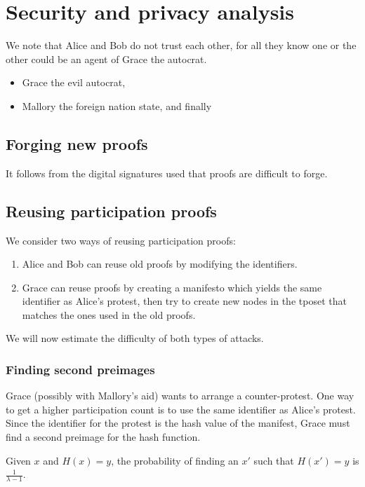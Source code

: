 \section{Security and privacy analysis}%
\label{SecurityAnalysis}

We note that Alice and Bob do not trust each other, for all they know one or the 
other could be an agent of Grace the autocrat.
\begin{itemize}
  \item Grace the evil autocrat,
  \item Mallory the foreign nation state, and finally
\end{itemize}


\subsection{Forging new proofs}

It follows from the digital signatures used that proofs are difficult to forge.

\subsection{Reusing participation proofs}

We consider two ways of reusing participation proofs:
\begin{enumerate}
  \item Alice and Bob can reuse old proofs by modifying the identifiers.
  \item Grace can reuse proofs by creating a manifesto which yields the same 
    identifier as Alice's protest, then try to create new nodes in the 
    \ac{tposet} that matches the ones used in the old proofs.
\end{enumerate}
We will now estimate the difficulty of both types of attacks.

\subsubsection{Finding second preimages}

Grace (possibly with Mallory's aid) wants to arrange a counter-protest.
One way to get a higher participation count is to use the same identifier as 
Alice's protest.
Since the identifier for the protest is the hash value of the manifest, Grace 
must find a second preimage for the hash function.

\begin{proposition}
  Given \(x\) and \(H(x) = y\), the probability of finding an \(x'\) such that 
  \(H(x') = y\) is \(\frac{1}{\lambda-1}\).
\end{proposition}

